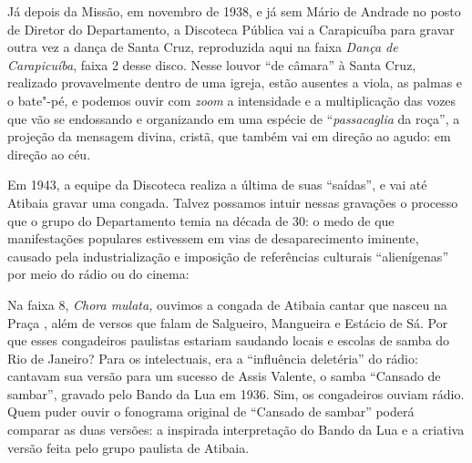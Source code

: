 Já depois da Missão, em novembro de 1938, e já sem Mário de Andrade no
posto de Diretor do Departamento, a Discoteca Pública vai a Carapicuíba
para gravar outra vez a dança de Santa Cruz, reproduzida aqui na faixa
\emph{Dança de Carapicuíba}, faixa 2 desse disco. Nesse louvor ``de
câmara'' à Santa Cruz, realizado provavelmente dentro de uma igreja,
estão ausentes a viola, as palmas e o bate"-pé, e podemos ouvir com
\emph{zoom} a intensidade e a multiplicação das vozes que vão se
endossando e organizando em uma espécie de ``\emph{passacaglia} da
roça'', a projeção da mensagem divina, cristã, que também vai em direção
ao agudo: em direção ao céu.

Em 1943, a equipe da Discoteca realiza a última de suas ``saídas'', e
vai até Atibaia gravar uma congada. Talvez possamos intuir nessas
gravações o processo que o grupo do Departamento temia na década de 30:
o medo de que manifestações populares estivessem em vias de
desaparecimento iminente, causado pela industrialização e imposição de
referências culturais ``alienígenas'' por meio do rádio ou do cinema:

\begin{quote}
\end{quote}

Na faixa 8, \emph{Chora mulata,} ouvimos a congada de Atibaia cantar que
nasceu na Praça , além de versos que falam de Salgueiro, Mangueira e
Estácio de Sá. Por que esses congadeiros paulistas estariam saudando
locais e escolas de samba do Rio de Janeiro? Para os intelectuais, era a
``influência deletéria'' do rádio: cantavam sua versão para um sucesso
de Assis Valente, o samba ``Cansado de sambar'', gravado pelo Bando da
Lua em 1936. Sim, os congadeiros ouviam rádio. Quem puder ouvir o
fonograma original de ``Cansado de sambar'' poderá comparar as duas
versões: a inspirada interpretação do Bando da Lua e a criativa versão
feita pelo grupo paulista de Atibaia.

